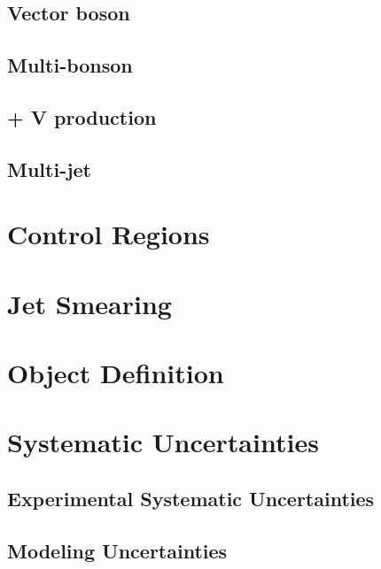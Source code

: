 \subsection{Vector boson}

\subsection{Multi-bonson}

\subsection{\ttbar + V production}

\subsection{Multi-jet}

\section{Control Regions}
\label{sec:analyses:cr}

\section{Jet Smearing}

\section{Object Definition}

\section{Systematic Uncertainties}

\subsection{Experimental Systematic Uncertainties}

\subsection{Modeling Uncertainties} 

